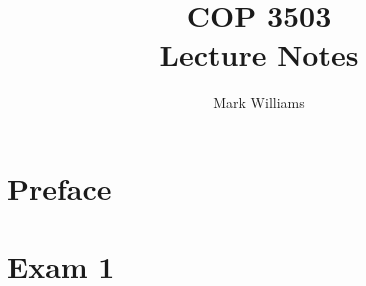 \documentclass{report}
\title{\Huge{COP 3503}\\Lecture Notes}
\author{\huge{Mark Williams}}
\date{}
\begin{document}
\maketitle
\newpage
{}
\tableofcontents
\pagebreak

\chapter*{Preface}
% 
\pagebreak
\chapter{Exam 1}

\end{document}

